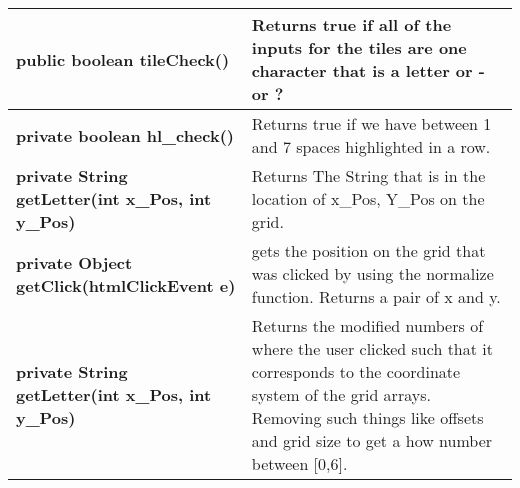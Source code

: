 \documentclass[11pt]{article}
\begin{document}
\begin{longtable}{|p{}|p{}|}
%
\hline
\textbf{public boolean tileCheck()} & Returns true if all of the inputs for the tiles are one character that is a letter or - or ?\\
%
\hline
\textbf{private boolean hl\_check()} & Returns true if we have between 1 and 7 spaces highlighted in a row.\\
%
\hline
\textbf{private String getLetter(int x\_Pos, int y\_Pos)} & Returns The String that is in the location of x\_Pos, Y\_Pos on the grid.\\
%
\hline
\textbf{private Object getClick(htmlClickEvent e)} & gets the position on the grid that was clicked by using the normalize function. Returns a pair of x and y. \\
%
\hline
\textbf{private String getLetter(int x\_Pos, int y\_Pos)} & Returns the modified numbers of where the user clicked such that it corresponds to the coordinate system of the grid arrays.
Removing such things like offsets and grid size to get a how number between [0,6]. \\
\hline
\end{longtable}
\end{document}
